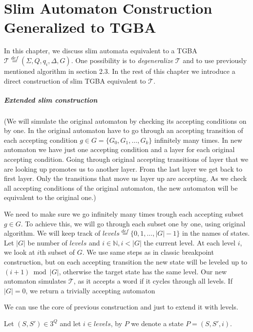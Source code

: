 \documentclass[
	digital,
nolof, nolot
]{fithesis3}
\newcommand{\cT}{\mathcal{T}}
\newcommand{\eqdef}{\overset{def}{=}}
\begin{document}
			
			\chapter{Slim Automaton Construction Generalized to TGBA} \label{section:gslim}
			In this chapter, we discuss slim automata equivalent to a TGBA $\cT\eqdef(\Sigma, Q, q_i, \Delta, G)$.
			One possibility is to \emph{degeneralize} $\cT$ and to use previously mentioned algorithm in section 2.3.
			In the rest of this chapter we introduce a direct construction of slim TGBA equivalent to $\cT$.
			\paragraph{Extended slim construction}
			(We will simulate the original automaton by checking its accepting conditions on by one. In the original automaton have to go through an accepting transition of each accepting condition $g \in G=\{G_0, G_1, \ldots, G_k\}$ infinitely many times. In new automaton we have just one accepting condition and a layer for each original accepting condition. Going through original accepting transitions of layer that we are looking up promotes us to another layer. From the last layer we get back to first layer. Only the transitions that move us layer up are accepting. As we check all accepting conditions of the original automaton, the new automaton will be equivalent to the original one.)
			
			We need to make sure we go infinitely many times trough each accepting subset $g \in G$.
			To achieve this, we will go through each subset one by one, using original algorithm. We will keep track of $levels\eqdef\{0,1,\ldots,|G|-1\}$ in the names of states. Let $|G|$ be number of $levels$ and $i \in \mathbb{N}, i<|G|$ the current level.
			At each level $i$, we look at $i$th subset of $G$. We use same steps as in classic breakpoint construction, but on each accepting transition the new state will be leveled up to $(i+1)\bmod|G|$, otherwise the target state has the same level. Our new automaton simulates $\cT$, as it accepts a word if it cycles through all levels. If $|G|=0$, we return a trivially accepting automaton
			
			We can use the core of previous construction and just to extend it with levels.
	
			
			Let $(S,S')\in 3^Q$ and let $i \in levels$, by $P$ we denote a state $P=(S,S',i)$.
			
\end{document}
